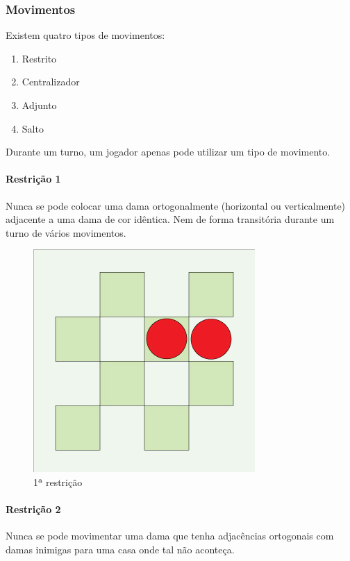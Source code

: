 \documentclass[a4paper,11pt]{article}
\begin{document}
\subsubsection{Movimentos}
Existem quatro tipos de movimentos:
\begin{enumerate}
  \item Restrito
  \item Centralizador
  \item Adjunto
  \item Salto
\end{enumerate}
Durante um turno, um jogador apenas pode utilizar um tipo de movimento.

\paragraph{Restrição 1}
Nunca se pode colocar uma dama ortogonalmente (horizontal ou verticalmente) adjacente a uma dama de cor idêntica. Nem de forma transitória durante um turno de vários movimentos.

\begin{figure}[H]
    \centering
    \includegraphics[scale=0.5]{res/2-restriction-1.jpg}
    \caption{1ª restrição}
    \label{fig:2-restriction-1.jpg}
\end{figure}

\paragraph{Restrição 2}
Nunca se pode movimentar uma dama que tenha adjacências ortogonais com damas inimigas para uma casa onde tal não aconteça.
\end{document}
